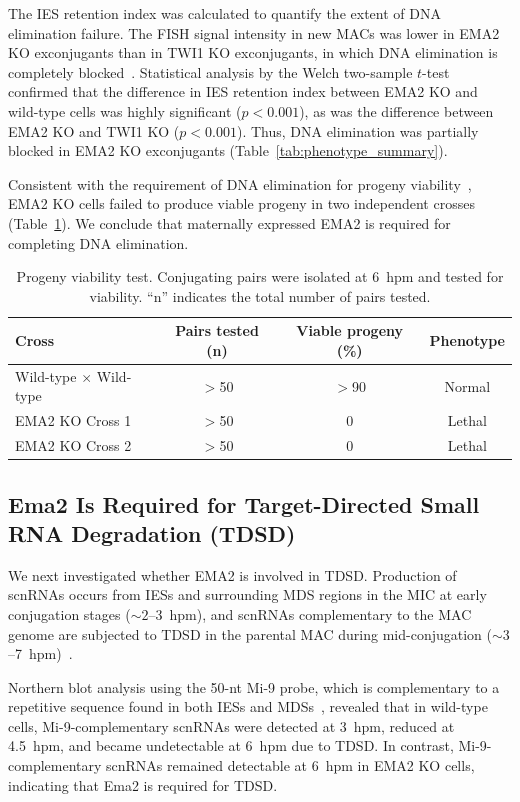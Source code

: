 \documentclass[12pt]{article}
\begin{document}
The IES retention index was calculated to quantify the extent of DNA elimination failure.
The FISH signal intensity in new MACs was lower in EMA2 KO exconjugants than in TWI1 KO exconjugants, in which DNA elimination is completely blocked~\citep{Noto2015}.
Statistical analysis by the Welch two-sample $t$-test confirmed that the difference in IES retention index between EMA2 KO and wild-type cells was highly significant ($p < 0.001$), as was the difference between EMA2 KO and TWI1 KO ($p < 0.001$).
Thus, DNA elimination was partially blocked in EMA2 KO exconjugants (Table~\ref{tab:phenotype_summary}).

Consistent with the requirement of DNA elimination for progeny viability~\citep{Cheng2010, Vogt2013}, EMA2 KO cells failed to produce viable progeny in two independent crosses (Table~\ref{tab:viability}).
We conclude that maternally expressed EMA2 is required for completing DNA elimination.

\begin{table}[htbp]
\centering
\caption{Progeny viability test. Conjugating pairs were isolated at 6~hpm and tested for viability. ``n'' indicates the total number of pairs tested.}
\label{tab:viability}
\begin{tabular}{lccc}
\toprule
\textbf{Cross} & \textbf{Pairs tested (n)} & \textbf{Viable progeny (\%)} & \textbf{Phenotype} \\
\midrule
Wild-type $\times$ Wild-type & $>$50 & $>$90 & Normal \\
EMA2 KO Cross 1 & $>$50 & 0 & Lethal \\
EMA2 KO Cross 2 & $>$50 & 0 & Lethal \\
\bottomrule
\end{tabular}
\end{table}

\subsection{Ema2 Is Required for Target-Directed Small RNA Degradation (TDSD)}

We next investigated whether EMA2 is involved in TDSD.
Production of scnRNAs occurs from IESs and surrounding MDS regions in the MIC at early conjugation stages (${\sim}2$--3~hpm), and scnRNAs complementary to the MAC genome are subjected to TDSD in the parental MAC during mid-conjugation (${\sim}3$--7~hpm)~\citep{Mochizuki2004a, Aronica2008, Schoeberl2012, Noto2015}.

Northern blot analysis using the 50-nt Mi-9 probe, which is complementary to a repetitive sequence found in both IESs and MDSs~\citep{Aronica2008}, revealed that in wild-type cells, Mi-9-complementary scnRNAs were detected at 3~hpm, reduced at 4.5~hpm, and became undetectable at 6~hpm due to TDSD.
In contrast, Mi-9-complementary scnRNAs remained detectable at 6~hpm in EMA2 KO cells, indicating that Ema2 is required for TDSD.
\end{document}
